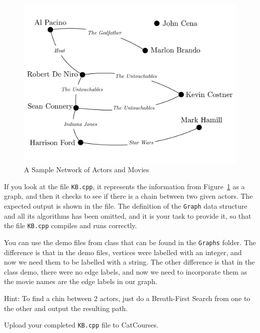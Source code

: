 \documentclass[11pt]{article}
\begin{document}
\begin{figure}[!htbp]
    \begin{center}
        \includegraphics[scale=0.4]{imdb.pdf}
    \end{center}
    \caption{A Sample Network of Actors and Movies}
    \label{imdb}
\end{figure}

If you look at the file \texttt{KB.cpp}, it represents the information from Figure~\ref{imdb} as a graph, and then it checks to see if there is a chain between two given actors. The expected output is shown in the file. The definition of the \texttt{Graph} data structure and all its algorithms has been omitted, and it is your task to provide it, so that the file \texttt{KB.cpp} compiles and runs correctly.

You can use the demo files from class that can be found in the \texttt{Graphs} folder. The difference is that in the demo files, vertices were labelled with an integer, and now we need them to be labelled with a string. The other difference is that in the class demo, there were no edge labels, and now we need to incorporate them as the movie names are the edge labels in our graph.

Hint: To find a chin between 2 actors, just do a Breath-First Search from one to the other and output the resulting path.

Upload your completed \texttt{KB.cpp} file to CatCourses.
\end{document}
